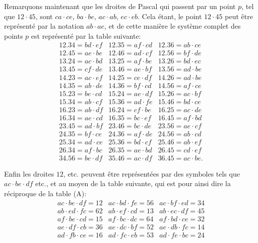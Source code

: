 \documentclass[12pt,a4paper]{article}
\theoremstyle{definition}
\begin{document}
Remarquons maintenant que les droites de Pascal qui passent par un point $p$, tel que $12 \cdot 45$, sont $ca \cdot ce$, $ba \cdot be$, $ac \cdot ab$, $ec \cdot eb$. Cela \'{e}tant, le point $12 \cdot 45$ peut \^{e}tre repr\'{e}sent\'{e} par la notation $ab \cdot ae$, et de cette mani\`{e}re le syst\`{e}me complet des points $p$ est repr\'{e}sent\'{e} par la table suivante:
\begin{equation}\tag{C}
\begin{array}{lll}
12.34 = bd \cdot ef & 12.35 = af \cdot cd & 12.36 = ab \cdot ce \\
12.45 = ae \cdot be & 12.46 = ad \cdot cf & 12.56 = bf \cdot de \\
13.24 = ac \cdot bd & 13.25 = af \cdot be & 13.26 = bd \cdot ec \\
13.45 = cf \cdot de & 13.46 = ae \cdot bf & 13.56 = ad \cdot be \\
14.23 = ac \cdot ef & 14.25 = ce \cdot df & 14.26 = ad \cdot be \\
14.35 = ab \cdot de & 14.36 = bf \cdot cd & 14.56 = af \cdot ce \\
15.23 = be \cdot cd & 15.24 = ae \cdot df & 15.26 = ac \cdot bf \\
15.34 = ab \cdot cf & 15.36 = ad \cdot fe & 15.46 = bd \cdot ce \\
16.23 = ab \cdot df & 16.24 = cf \cdot be & 16.25 = ac \cdot de \\
16.34 = ae \cdot cd & 16.35 = bc \cdot ef & 16.45 = af \cdot bd \\
23.45 = ad \cdot bf & 23.46 = bc \cdot de & 23.56 = ae \cdot cf \\
24.35 = bf \cdot ce & 24.36 = af \cdot de & 24.56 = ab \cdot cd \\
25.34 = ad \cdot ce & 25.36 = bd \cdot cf & 25.46 = ab \cdot ef \\
26.34 = af \cdot bc & 26.35 = ae \cdot bd & 26.45 = cd \cdot ef \\
34.56 = be \cdot df & 35.46 = ac \cdot df & 36.45 = ac \cdot be.
\end{array}
\end{equation}

Enfin les droites $12$, etc. peuvent \^{e}tre repr\'{e}sent\'{e}es par des symboles tels que $ac \cdot be \cdot df$ etc., et au moyen de la table suivante, qui est pour ainsi dire la r\'{e}ciproque de la table (A):
\begin{equation}\tag{D}
\begin{array}{lll}
ac \cdot be \cdot df = 12 & ac \cdot bd \cdot fe = 56 & ac \cdot bf \cdot ed = 34 \\
ab \cdot ed \cdot fc = 62 & ab \cdot ef \cdot cd = 13 & ab \cdot ec \cdot df = 45 \\
af \cdot be \cdot cd = 15 & af \cdot bc \cdot dc = 64 & af \cdot bd \cdot ce = 32 \\
ae \cdot df \cdot cb = 36 & ae \cdot dc \cdot bf = 52 & ae \cdot db \cdot fc = 14 \\
ad \cdot fb \cdot ce = 16 & ad \cdot fc \cdot eb = 53 & ad \cdot fe \cdot bc = 24
\end{array}
\end{equation}
\end{document}
